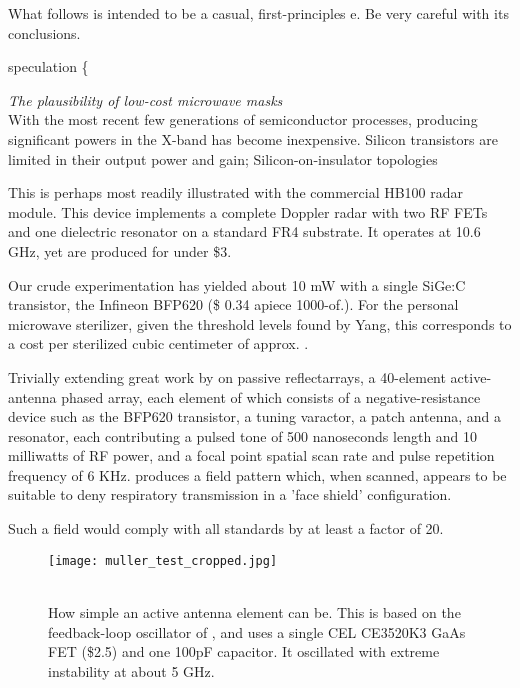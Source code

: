 \documentclass[paper.tex]{subfiles}
\begin{document}
\begin{autem}
What follows is intended to be a casual, first-principles e. Be very careful with its conclusions.
\end{autem}

{\color{red} speculation \{ } 

\clearpage
{\Large \it The plausibility of low-cost microwave masks}\\

With the most recent few generations of semiconductor processes, producing significant powers in the X-band has become inexpensive. Silicon transistors are limited in their output power and gain; Silicon-on-insulator topologies 

This is perhaps most readily illustrated with the commercial HB100 radar module. This device implements a complete Doppler radar with two RF FETs and one dielectric resonator on a standard FR4 substrate. It operates at 10.6 GHz, yet are produced for under \$3.

Our crude experimentation has yielded about 10 mW with a single SiGe:C transistor, the Infineon BFP620 (\$ 0.34 apiece \@ 1000-of.). For the personal microwave sterilizer, given the threshold levels found by Yang, this corresponds to a cost per sterilized cubic centimeter of approx. \cite{BFP620H7764XTSA1}.




Trivially extending great work by \cite{Focusing} on passive reflectarrays, a 40-element active-antenna phased array, each element of which consists of a negative-resistance device such as the BFP620 transistor, a tuning varactor, a patch antenna, and a resonator, each contributing a pulsed tone of 500 nanoseconds length and 10 milliwatts of RF power, and a focal point spatial scan rate and pulse repetition frequency of 6 KHz. produces a field pattern which, when scanned, appears to be suitable to deny respiratory transmission in a 'face shield' configuration. 

Such a field would comply with all standards by at least a factor of 20.


\begin{figure}[H]
	\captionsetup{singlelinecheck = false, justification=justified}
	\centering
	\texttt{[image: muller\_test\_cropped.jpg]}
	\caption{\\ How simple an active antenna element can be. This is based on the feedback-loop oscillator of \cite{SmallSize2008}, and uses a single CEL CE3520K3 GaAs FET (\$2.5) and one 100pF capacitor. It oscillated with extreme instability at about 5 GHz.}
\end{figure}
\end{document}
